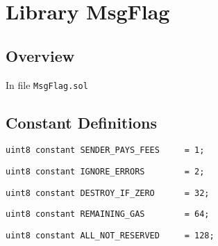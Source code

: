 
\chapter{Library MsgFlag}

\minitoc

\section{Overview}


In file {\tt MsgFlag.sol}

\section{Constant Definitions}


\begin{lstlisting}[firstnumber=4]
    uint8 constant SENDER_PAYS_FEES     = 1;
\end{lstlisting}

\begin{lstlisting}[firstnumber=5]
    uint8 constant IGNORE_ERRORS        = 2;
\end{lstlisting}

\begin{lstlisting}[firstnumber=6]
    uint8 constant DESTROY_IF_ZERO      = 32;
\end{lstlisting}

\begin{lstlisting}[firstnumber=7]
    uint8 constant REMAINING_GAS        = 64;
\end{lstlisting}

\begin{lstlisting}[firstnumber=8]
    uint8 constant ALL_NOT_RESERVED     = 128;
\end{lstlisting}
